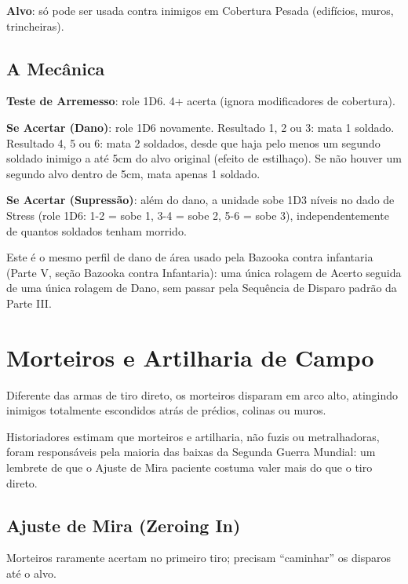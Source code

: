 \textbf{Alvo}: só pode ser usada contra inimigos em Cobertura Pesada (edifícios, muros, trincheiras).

\subsection{A Mecânica}

\textbf{Teste de Arremesso}: role 1D6. 4+ acerta (ignora modificadores de cobertura).

\textbf{Se Acertar (Dano)}: role 1D6 novamente. Resultado 1, 2 ou 3: mata 1 soldado. Resultado 4, 5 ou 6: mata 2 soldados, desde que haja pelo menos um segundo soldado inimigo a até 5cm do alvo original (efeito de estilhaço). Se não houver um segundo alvo dentro de 5cm, mata apenas 1 soldado.

\textbf{Se Acertar (Supressão)}: além do dano, a unidade sobe 1D3 níveis no dado de Stress (role 1D6: 1-2 = sobe 1, 3-4 = sobe 2, 5-6 = sobe 3), independentemente de quantos soldados tenham morrido.

\begin{nota}
Este é o mesmo perfil de dano de área usado pela Bazooka contra infantaria (Parte V, seção Bazooka contra Infantaria): uma única rolagem de Acerto seguida de uma única rolagem de Dano, sem passar pela Sequência de Disparo padrão da Parte III.
\end{nota}

\section{Morteiros e Artilharia de Campo}

Diferente das armas de tiro direto, os morteiros disparam em arco alto, atingindo inimigos totalmente escondidos atrás de prédios, colinas ou muros.

\begin{nota}
Historiadores estimam que morteiros e artilharia, não fuzis ou metralhadoras, foram responsáveis pela maioria das baixas da Segunda Guerra Mundial: um lembrete de que o Ajuste de Mira paciente costuma valer mais do que o tiro direto.
\end{nota}

\subsection{Ajuste de Mira (Zeroing In)}

Morteiros raramente acertam no primeiro tiro; precisam ``caminhar'' os disparos até o alvo.


